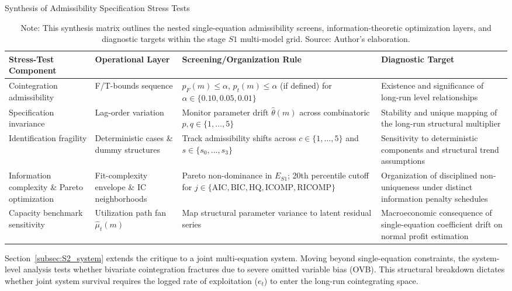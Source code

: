 \documentclass[11pt]{article}
\begin{document}
\begin{table}[h!]
\centering
\small
\caption{Synthesis of Admissibility Specification Stress Tests}
\label{tab:s1_stress_synthesis}
\begin{tabular}{@{}>{\raggedright\arraybackslash}p{3.2cm}>{\raggedright\arraybackslash}p{2.6cm}>{\raggedright\arraybackslash}p{3.8cm}>{\raggedright\arraybackslash}p{4.0cm}@{}}
\toprule
Stress-Test Component & Operational Layer & Screening/Organization Rule & Diagnostic Target \\
\midrule
\midrule
Cointegration admissibility & F/T-bounds sequence & $p_F(m) \leq \alpha$, $p_t(m) \leq \alpha$ (if defined) for $\alpha \in \{0.10, 0.05, 0.01\}$ & Existence and significance of long-run level relationships \\
Specification invariance & Lag-order variation & Monitor parameter drift $\hat{\theta}(m)$ across combinatoric $p,q \in \{1,\dots,5\}$ & Stability and unique mapping of the long-run structural multiplier \\
Identification fragility & Deterministic cases \& dummy structures & Track admissibility shifts across $c \in \{1,\dots,5\}$ and $s \in \{s_0,\dots,s_3\}$ & Sensitivity to deterministic components and structural trend assumptions \\
Information complexity \& Pareto optimization & Fit-complexity envelope \& IC neighborhoods & Pareto non-dominance in $E_{S1}$; 20th percentile cutoff for $j \in \{\text{AIC}, \text{BIC}, \text{HQ}, \text{ICOMP}, \text{RICOMP}\}$ & Organization of disciplined non-uniqueness under distinct information penalty schedules \\
Capacity benchmark sensitivity & Utilization path fan $\hat{\mu}_t(m)$ & Map structural parameter variance to latent residual series & Macroeconomic consequence of single-equation coefficient drift on normal profit estimation \\
\bottomrule
\end{tabular}
\caption*{Note: This synthesis matrix outlines the nested single-equation admissibility screens, information-theoretic optimization layers, and diagnostic targets within the stage $S1$ multi-model grid. Source: Author's elaboration.}
\end{table}

Section~\ref{subsec:S2_system} extends the critique to a joint multi-equation system. Moving beyond single-equation constraints, the system-level analysis tests whether bivariate cointegration fractures due to severe omitted variable bias (OVB). This structural breakdown dictates whether joint system survival requires the logged rate of exploitation ($e_t$) to enter the long-run cointegrating space.
\end{document}
